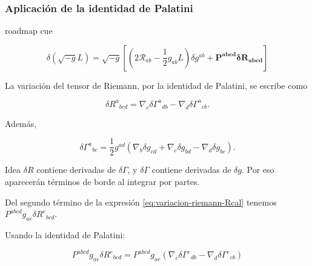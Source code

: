 \documentclass{beamer}
\newcommand{\Rcal}{\mathcal{R}}
\newcommand{\Eq}[1]{\eqref{#1}}
\newcommand{\CompactDisplaySpacing}{%
  \setlength{\abovedisplayskip}{2pt plus 1pt minus 1pt}%
  \setlength{\belowdisplayskip}{2pt plus 1pt minus 1pt}%
  \setlength{\abovedisplayshortskip}{0pt plus 1pt}%
  \setlength{\belowdisplayshortskip}{1pt plus 1pt}%
}
\newcommand{\RoadmapCue}[1]{%
    \begin{beamercolorbox}[
        wd=\textwidth,
        sep=.55ex,
        leftskip=.8ex,
        rounded=true
    ]{roadmap cue}

    \scriptsize
    \enspace #1

    \end{beamercolorbox}

    \vspace{.25em}
}
\begin{document}
\begin{frame}[label=nav-frame-028]
\frametitle{Aplicación de la identidad de Palatini}
\scriptsize
\CompactDisplaySpacing
\RoadmapCue{
\[
\delta(\sqrt{-g}L)
=
\sqrt{-g}
\left[
\left(2\Rcal_{ab}-\frac12g_{ab}L\right)\delta g^{ab}
+ \bm{P^{abcd}\delta R_{abcd}}
\right]
\]
}

La variación del tensor de Riemann, por la identidad de Palatini, se escribe como

\[
\boxed{
\delta R^a{}_{bcd}
=
\nabla_c\delta\Gamma^a{}_{db}
-
\nabla_d\delta\Gamma^a{}_{cb}.
}
\]


Además,

\[
\delta\Gamma^a{}_{bc}
=
\frac12 g^{ad}
\left(
\nabla_b\delta g_{cd}
+
\nabla_c\delta g_{bd}
-
\nabla_d\delta g_{bc}
\right).
\]

\begin{block}{Idea}
$\delta R$ contiene derivadas de $\delta \Gamma$, y $\delta\Gamma$ contiene derivadas de $\delta g$. Por eso aparecerán términos de borde al integrar por partes.
\end{block}


Del segundo término de la expresión \Eq{eq:variacion-riemann-Rcal} tenemos $P^{abcd}g_{ae}\delta R^e{}_{bcd}$.\newline

Usando la identidad de Palatini:

\[
P^{abcd}g_{ae}\delta R^e{}_{bcd}
=
P^{abcd}g_{ae}
\left(
\nabla_c\delta\Gamma^e{}_{db}
-
\nabla_d\delta\Gamma^e{}_{cb}
\right)
\]

\end{frame}
\end{document}
